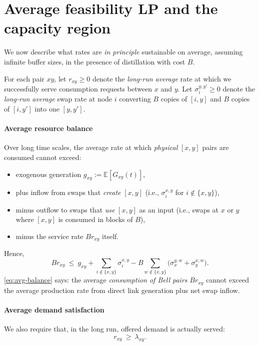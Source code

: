 \documentclass[11pt]{article}
\newcommand{\E}{\mathbb{E}}
\begin{document}
\section{Average feasibility LP and the capacity region}

We now describe what rates are \emph{in principle} sustainable on average, assuming infinite buffer sizes, in the presence of distillation with cost $B$.

For each pair $xy$, let $r_{xy}\ge 0$ denote the \emph{long-run average} rate at which we successfully serve consumption requests between $x$ and $y$. Let $\sigma_i^{y,y'}\ge 0$ denote the \emph{long-run average} swap rate at node $i$ converting $B$ copies of $[i,y]$ and $B$ copies of $[i,y']$ into one $[y,y']$.

\paragraph{Average resource balance}

Over long time scales, the average rate at which \emph{physical} $[x,y]$ pairs are consumed cannot exceed:
\begin{itemize}[leftmargin=2em]
\item exogenous generation $g_{xy} := \E[G_{xy}(t)]$,
\item plus inflow from swaps that \emph{create} $[x,y]$ (i.e., $\sigma_i^{x,y}$ for $i\notin\{x,y\}$),
\item minus outflow to swaps that \emph{use} $[x,y]$ as an input (i.e., swaps at $x$ or $y$ where $[x,y]$ is consumed in blocks of $B$),
\item minus the service rate $B r_{xy}$ itself.
\end{itemize}

Hence, 
\begin{equation}
B r_{xy}
\ \le\
g_{xy}
+\sum_{i\notin\{x,y\}}\sigma_i^{x,y}
- B\sum_{w\notin\{x,y\}}
\big(\sigma_x^{y,w}+\sigma_y^{x,w}\big).
\label{eq:avg-balance}
\end{equation}
\eqref{eq:avg-balance} says: the average \emph{consumption of Bell pairs} $B r_{xy}$ cannot exceed the average production rate from direct link generation plus net swap inflow.

\paragraph{Average demand satisfaction}

We also require that, in the long run, offered demand is actually served:
\begin{equation}
r_{xy}\ \ge\ \lambda_{xy}.
\label{eq:avg-demand}
\end{equation}
\end{document}
